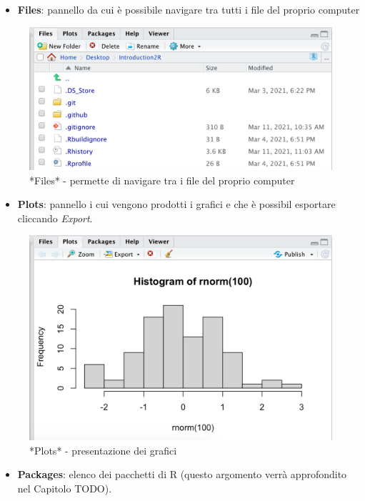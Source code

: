 \documentclass[
]{book}
\providecommand{\tightlist}{%
  \setlength{\itemsep}{0pt}\setlength{\parskip}{0pt}}
\begin{document}
\begin{itemize}
\tightlist
\item
  \textbf{Files}: pannello da cui è possibile navigare tra tutti i file del proprio computer
\end{itemize}

\begin{figure}

{\centering \includegraphics[width=0.6\linewidth]{images/files} 

}

\caption{*Files* - permette di navigare tra i file del proprio computer}\label{fig:files}
\end{figure}

\begin{itemize}
\tightlist
\item
  \textbf{Plots}: pannello i cui vengono prodotti i grafici e che è possibil esportare cliccando \emph{Export}.
\end{itemize}

\begin{figure}

{\centering \includegraphics[width=0.6\linewidth]{images/plots} 

}

\caption{*Plots* - presentazione dei grafici}\label{fig:plots}
\end{figure}

\begin{itemize}
\tightlist
\item
  \textbf{Packages}: elenco dei pacchetti di R (questo argomento verrà approfondito nel Capitolo TODO).
\end{itemize}
\end{document}
